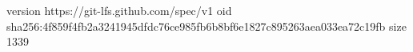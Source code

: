version https://git-lfs.github.com/spec/v1
oid sha256:4f859f4fb2a3241945dfdc76ce985fb6b8bf6e1827c895263aea033ea72c19fb
size 1339
